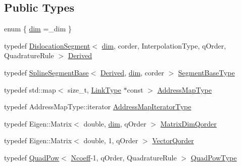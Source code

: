 \subsection*{Public Types}
\begin{DoxyCompactItemize}
\item 
enum \{ \hyperlink{classmodel_1_1_dislocation_segment_a10a92a3e7fa3a34303d85bd00da0de02a026f372e58773b98ecc0b1e1db99a323}{dim} =\+\_\+dim
 \}
\item 
typedef \hyperlink{classmodel_1_1_dislocation_segment}{Dislocation\+Segment}$<$ \hyperlink{classmodel_1_1_dislocation_segment_a10a92a3e7fa3a34303d85bd00da0de02a026f372e58773b98ecc0b1e1db99a323}{dim}, corder, Interpolation\+Type, q\+Order, Quadrature\+Rule $>$ \hyperlink{classmodel_1_1_dislocation_segment_a7767d69273160000e7597366ac1dc6e8}{Derived}
\item 
typedef \hyperlink{classmodel_1_1_spline_segment_base}{Spline\+Segment\+Base}$<$ \hyperlink{classmodel_1_1_dislocation_segment_a7767d69273160000e7597366ac1dc6e8}{Derived}, \hyperlink{classmodel_1_1_dislocation_segment_a10a92a3e7fa3a34303d85bd00da0de02a026f372e58773b98ecc0b1e1db99a323}{dim}, corder $>$ \hyperlink{classmodel_1_1_dislocation_segment_a3159fd5418369676fcfb52cbc790ae35}{Segment\+Base\+Type}
\item 
typedef std\+::map$<$ size\+\_\+t, \hyperlink{_spline_node_base__corder0_8h_ab09ccc0af6ea9402dfef7b0eac55cff3}{Link\+Type} $\ast$const  $>$ \hyperlink{classmodel_1_1_dislocation_segment_aabe470c119860a0360c9425a959afe04}{Address\+Map\+Type}
\item 
typedef Address\+Map\+Type\+::iterator \hyperlink{classmodel_1_1_dislocation_segment_a43728c78eeaad4880736b8d7a42d1a3d}{Address\+Map\+Iterator\+Type}
\item 
typedef Eigen\+::\+Matrix$<$ double, \hyperlink{classmodel_1_1_dislocation_segment_a10a92a3e7fa3a34303d85bd00da0de02a026f372e58773b98ecc0b1e1db99a323}{dim}, q\+Order $>$ \hyperlink{classmodel_1_1_dislocation_segment_a038d9448e2a98c8da218d1dae63576e1}{Matrix\+Dim\+Qorder}
\item 
typedef Eigen\+::\+Matrix$<$ double, 1, q\+Order $>$ \hyperlink{classmodel_1_1_dislocation_segment_a281818c12d5407c323c68433ed958587}{Vector\+Qorder}
\item 
typedef \hyperlink{classmodel_1_1_quad_pow}{Quad\+Pow}$<$ \hyperlink{_spline_enums_8h_a7cc2e4244ca368f68e5746185eda6c4aa247e9ee4cf5980e4b82b85daddd8f437}{Ncoeff}-\/1, q\+Order, Quadrature\+Rule $>$ \hyperlink{classmodel_1_1_dislocation_segment_a3825205d095f7de5ed97545fbfe3580c}{Quad\+Pow\+Type}

\end{DoxyCompactItemize}
